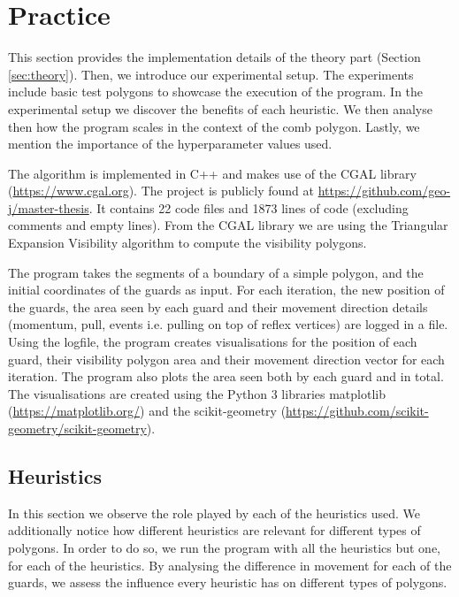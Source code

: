 \section{Practice}
\label{sec:experiments}


This section provides the implementation details of the theory part (Section \ref{sec:theory}). Then, we  introduce our experimental setup. The experiments include basic test polygons to showcase the execution of the program. In the experimental setup we discover the benefits of each heuristic. We then analyse then how the program scales in the context of the comb polygon. Lastly, we  mention the importance of the hyperparameter values used.

The algorithm is implemented in C++ and makes use of the CGAL library (\url{https://www.cgal.org}). The project is publicly found at \url{https://github.com/geo-j/master-thesis}. It contains 22 code files and 1873 lines of code (excluding comments and empty lines).
From the CGAL library we are using the Triangular Expansion Visibility algorithm \cite{DBLP:journals/corr/BungiuHHHK14} to compute the visibility polygons.

The program takes the segments of a boundary of a simple polygon, and the initial coordinates of the guards as input. For each iteration, the new position of the guards, the area seen by each guard and their movement direction details (momentum, pull, events i.e. pulling on top of reflex vertices) are logged in a file. Using the logfile, the program creates visualisations for the position of each guard, their visibility polygon area and their movement direction vector for each iteration. The program also plots the area seen both by each guard and in total. The visualisations are created using the Python 3 libraries matplotlib (\url{https://matplotlib.org/}) and the scikit-geometry (\url{https://github.com/scikit-geometry/scikit-geometry}).





\subsection{Heuristics}
In this section we  observe the role played by each of the heuristics used. We  additionally notice how different heuristics are relevant for different types of polygons. In order to do so, we  run the program with all the heuristics but one, for each of the heuristics. By analysing the difference in movement for each of the guards, we assess the influence every heuristic has on different types of polygons.

